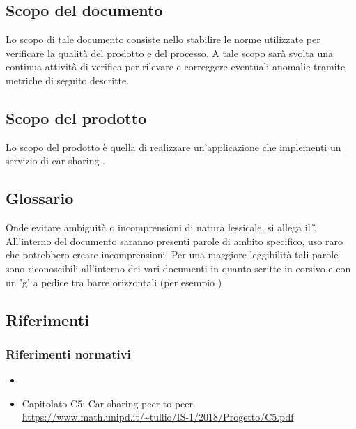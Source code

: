 \subsection{Scopo del documento}
Lo scopo di tale documento consiste nello stabilire le norme utilizzate per verificare la qualità del prodotto e del processo. A tale scopo sarà svolta una continua attività di verifica per rilevare e correggere eventuali anomalie tramite metriche di seguito descritte.
\subsection{Scopo del prodotto}
Lo scopo del prodotto è quella di realizzare un'applicazione  che implementi un servizio di car sharing .
\subsection{Glossario}
Onde evitare ambiguità o incomprensioni di natura lessicale, si allega il \G.
All'interno del documento saranno presenti parole di ambito specifico, uso raro che potrebbero creare incomprensioni. Per una maggiore leggibilità tali parole sono riconoscibili all'interno dei vari documenti in quanto scritte in corsivo e con un 'g' a pedice tra barre orizzontali (per esempio )
\subsection{Riferimenti}
    \subsubsection{Riferimenti normativi}
    \begin{itemize}
        \item \NdP
        \item Capitolato C5: Car sharing peer to peer.
        \\ \url{ https://www.math.unipd.it/~tullio/IS-1/2018/Progetto/C5.pdf}
    \end{itemize}
